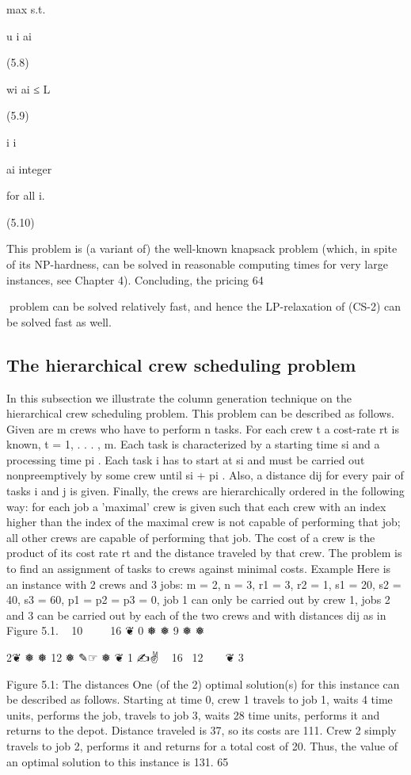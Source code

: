 max
s.t.

u i ai

(5.8)

wi ai ≤ L

(5.9)

i
i

ai integer

for all i.

(5.10)

This problem is (a variant of) the well-known knapsack problem (which, in spite of its NP-hardness, can
be solved in reasonable computing times for very large instances, see Chapter 4). Concluding, the pricing
64

problem can be solved relatively fast, and hence the LP-relaxation of (CS-2) can be solved fast as well.

\subsection{The hierarchical crew scheduling problem}

In this subsection we illustrate the column generation technique on the hierarchical crew scheduling
problem. This problem can be described as follows. Given are m crews who have to perform n tasks.
For each crew t a cost-rate rt is known, t = 1, . . . , m. Each task is characterized by a starting time si
and a processing time pi . Each task i has to start at si and must be carried out nonpreemptively by
some crew until si + pi . Also, a distance dij for every pair of tasks i and j is given. Finally, the crews are
hierarchically ordered in the following way: for each job a 'maximal' crew is given such that each crew
with an index higher than the index of the maximal crew is not capable of performing that job; all other
crews are capable of performing that job. The cost of a crew is the product of its cost rate rt and the
distance traveled by that crew. The problem is to find an assignment of tasks to crews against minimal
costs.
Example Here is an instance with 2 crews and 3 jobs:
m = 2, n = 3, r1 = 3, r2 = 1, s1 = 20, s2 = 40, s3 = 60, p1 = p2 = p3 = 0,
job 1 can only be carried out by crew 1, jobs 2 and 3 can be carried out by each of the two crews and
with distances dij as in Figure 5.1.
 
10 
 
  16
❦
0
❅
❅
9
❅
❅

2❦
❅
❅ 12
❅ ✎☞
❅ ❦
1
✍✌
 
16  12
 
 
❦
3

Figure 5.1: The distances
One (of the 2) optimal solution(s) for this instance can be described as follows. Starting at time 0, crew
1 travels to job 1, waits 4 time units, performs the job, travels to job 3, waits 28 time units, performs it
and returns to the depot. Distance traveled is 37, so its costs are 111. Crew 2 simply travels to job 2,
performs it and returns for a total cost of 20. Thus, the value of an optimal solution to this instance is
131.
65

